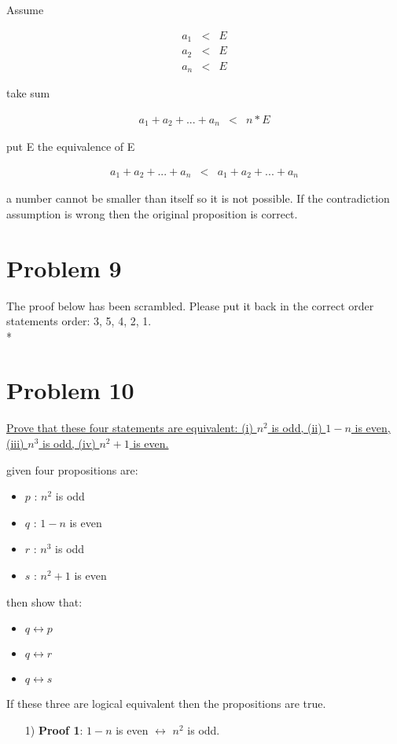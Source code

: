 \documentclass[11pt]{article}
\begin{document}
{		Assume
		
		\begin{eqnarray*}
		a_{1} & < & E\\
		a_{2} & < & E\\
	
		a_{n} & < & E
		\end{eqnarray*}
		
		take sum
		
		\begin{eqnarray*}
		a_{1} + a_{2} + ... + a_{n} & < & n \ast E
		\end{eqnarray*}
		
		put E the equivalence of E 
		
		\begin{eqnarray*}
		a_{1} + a_{2} + ... + a_{n} & < & a_{1} + a_{2} + ... + a_{n}
		\end{eqnarray*}
		
		a number cannot be smaller than itself so it is not possible.
		If the contradiction assumption is wrong then the original proposition is correct.
	\section*{Problem 9}
	The proof below has been scrambled. Please put it back in the correct order
	statements order: 3, 5, 4, 2, 1.
		\\*\\
	\section*{Problem 10}
	\underline{Prove that these four statements are equivalent: (i) $n^2$ is odd, (ii) $1-n$ is even, (iii) $n^3$ is odd, (iv) $n^2+1$ is even.}
	
	
	given four propositions are:
	\begin{itemize}
	\item	$p$ : $n^2$ is odd
	\item $q$ : $1-n$ is even
	\item $r$ : $n^3$ is odd
	\item $s$ : $n^2+1$ is even
	\end{itemize}
	then show that:
	\begin{itemize}
	\item $q \leftrightarrow p$
	\item $q \leftrightarrow r$
	\item $q \leftrightarrow s$
	\end{itemize}
	If these three are logical equivalent then the propositions are true.
	\begin{itemize}
	\item [1)]  \textbf{Proof 1}: $1-n$ is even $\leftrightarrow$ $n^2$ is odd.
	

\end{itemize}}
\end{document}
